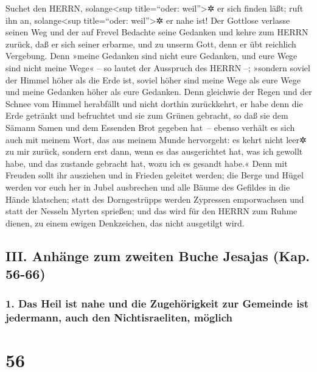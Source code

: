 Suchet den HERRN, solange\textless sup title=``oder:
weil''\textgreater✲ er sich finden läßt; ruft ihn an,
solange\textless sup title=``oder: weil''\textgreater✲ er nahe ist!
Der Gottlose verlasse seinen Weg und der auf Frevel
Bedachte seine Gedanken und kehre zum HERRN zurück, daß er sich seiner
erbarme, und zu unserm Gott, denn er übt reichlich Vergebung.
Denn »meine Gedanken sind nicht eure Gedanken, und eure
Wege sind nicht meine Wege« -- so lautet der Ausspruch des HERRN --;
»sondern soviel der Himmel höher als die Erde ist, soviel
höher sind meine Wege als eure Wege und meine Gedanken höher als eure
Gedanken. Denn gleichwie der Regen und der Schnee vom
Himmel herabfällt und nicht dorthin zurückkehrt, er habe denn die Erde
getränkt und befruchtet und sie zum Grünen gebracht, so daß sie dem
Sämann Samen und dem Essenden Brot gegeben hat~-- ebenso
verhält es sich auch mit meinem Wort, das aus meinem Munde hervorgeht:
es kehrt nicht leer✲ zu mir zurück, sondern erst dann, wenn es das
ausgerichtet hat, was ich gewollt habe, und das zustande gebracht hat,
wozu ich es gesandt habe.« Denn mit Freuden sollt ihr
ausziehen und in Frieden geleitet werden; die Berge und Hügel werden vor
euch her in Jubel ausbrechen und alle Bäume des Gefildes in die Hände
klatschen; statt des Dorngestrüpps werden Zypressen
emporwachsen und statt der Nesseln Myrten sprießen; und das wird für den
HERRN zum Ruhme dienen, zu einem ewigen Denkzeichen, das nicht
ausgetilgt wird.

\hypertarget{iii.-anhuxe4nge-zum-zweiten-buche-jesajas-kap.-56-66}{%
\subsection{III. Anhänge zum zweiten Buche Jesajas (Kap.
56-66)}\label{iii.-anhuxe4nge-zum-zweiten-buche-jesajas-kap.-56-66}}

\hypertarget{das-heil-ist-nahe-und-die-zugehuxf6rigkeit-zur-gemeinde-ist-jedermann-auch-den-nichtisraeliten-muxf6glich}{%
\subsubsection{1. Das Heil ist nahe und die Zugehörigkeit zur Gemeinde
ist jedermann, auch den Nichtisraeliten,
möglich}\label{das-heil-ist-nahe-und-die-zugehuxf6rigkeit-zur-gemeinde-ist-jedermann-auch-den-nichtisraeliten-muxf6glich}}

\hypertarget{section-55}{%
\section{56}\label{section-55}}

